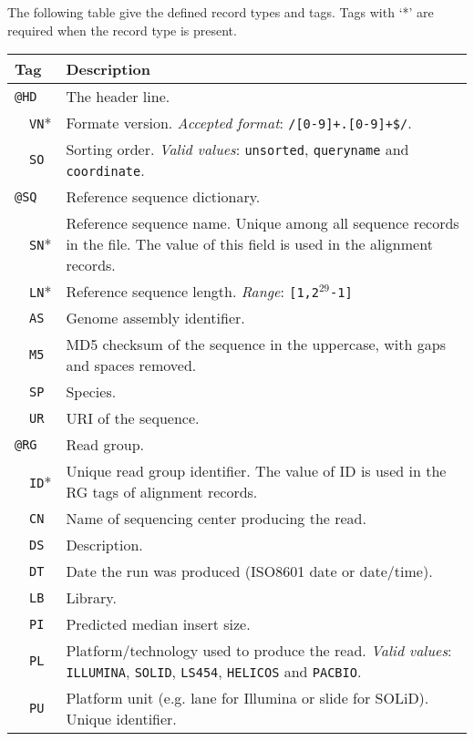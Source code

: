 \documentclass[10pt]{article}
\begin{document}
The following table give the defined record types and tags. Tags with
`*' are required when the record type is present.
\begin{center}
\small
\begin{tabular}{|l|l|p{13.5cm}|}
  \hline
  \multicolumn{2}{|l|}{\bf Tag} & {\bf Description} \\
  \hline
  \multicolumn{2}{|l}{\tt @HD} & The header line. \\\cline{2-3}
  & {\tt VN}* & Formate version. \emph{Accepted format}: {\tt /\char94[0-9]+\char92.[0-9]+\$/}.\\\cline{2-3}
  & {\tt SO} & Sorting order. \emph{Valid values}: {\tt unsorted}, {\tt queryname} and {\tt coordinate}. \\\hline
  \multicolumn{2}{|l}{\tt @SQ} & Reference sequence dictionary. \\\cline{2-3}
  & {\tt SN}* & Reference sequence name. Unique among all
  sequence records in the file. The value of this field is used in the
  alignment records. \\\cline{2-3}
  & {\tt LN}* & Reference sequence length. \emph{Range}: {\tt [1,2$^{29}$-1]}\\\cline{2-3}
  & {\tt AS} & Genome assembly identifier. \\\cline{2-3}
  & {\tt M5} & MD5 checksum of the sequence in the uppercase, with gaps and spaces removed.\\\cline{2-3}
  & {\tt SP} & Species.\\\cline{2-3}
  & {\tt UR} & URI of the sequence.\\\hline
  \multicolumn{2}{|l}{\tt @RG} & Read group. \\\cline{2-3}
  & {\tt ID}* & Unique read group identifier. The value of ID
  is used in the RG tags of alignment records. \\\cline{2-3}
  & {\tt CN} & Name of sequencing center producing the read.\\\cline{2-3}
  & {\tt DS} & Description.\\\cline{2-3}
  & {\tt DT} & Date the run was produced (ISO8601 date or date/time).\\\cline{2-3}
  & {\tt LB} & Library.\\\cline{2-3}
  & {\tt PI} & Predicted median insert size.\\\cline{2-3}
  & {\tt PL} & Platform/technology used to produce the read. \emph{Valid values}:
  {\tt ILLUMINA}, {\tt SOLID}, {\tt LS454}, {\tt HELICOS} and {\tt PACBIO}.\\\cline{2-3}
  & {\tt PU} & Platform unit (e.g. lane for Illumina or slide for SOLiD). Unique identifier.\\\cline{2-3}

\end{tabular}
\end{center}
\end{document}
